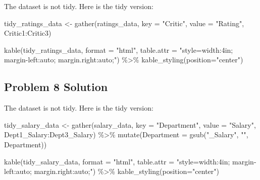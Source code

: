 \documentclass[
  letterpaper,
  DIV=11,
  numbers=noendperiod]{scrreprt}
\newenvironment{Shaded}{\begin{snugshade}}{\end{snugshade}}
\newcommand{\AttributeTok}[1]{\textcolor[rgb]{0.40,0.45,0.13}{#1}}
\newcommand{\FunctionTok}[1]{\textcolor[rgb]{0.28,0.35,0.67}{#1}}
\newcommand{\NormalTok}[1]{\textcolor[rgb]{0.00,0.23,0.31}{#1}}
\newcommand{\OtherTok}[1]{\textcolor[rgb]{0.00,0.23,0.31}{#1}}
\newcommand{\SpecialCharTok}[1]{\textcolor[rgb]{0.37,0.37,0.37}{#1}}
\newcommand{\StringTok}[1]{\textcolor[rgb]{0.13,0.47,0.30}{#1}}
\begin{document}
The dataset is not tidy. Here is the tidy version:

\begin{Shaded}
\begin{Highlighting}[]
\NormalTok{tidy\_ratings\_data }\OtherTok{\textless{}{-}} \FunctionTok{gather}\NormalTok{(ratings\_data, }\AttributeTok{key =} \StringTok{"Critic"}\NormalTok{, }\AttributeTok{value =} \StringTok{"Rating"}\NormalTok{, Critic1}\SpecialCharTok{:}\NormalTok{Critic3)}

\FunctionTok{kable}\NormalTok{(tidy\_ratings\_data, }\AttributeTok{format =} \StringTok{"html"}\NormalTok{, }\AttributeTok{table.attr =} \StringTok{"style=\textquotesingle{}width:4in; margin{-}left:auto; margin.right:auto;\textquotesingle{}"}\NormalTok{)  }\SpecialCharTok{\%\textgreater{}\%}
  \FunctionTok{kable\_styling}\NormalTok{(}\AttributeTok{position=}\StringTok{"center"}\NormalTok{)}
\end{Highlighting}
\end{Shaded}

\subsection*{Problem 8 Solution}\label{problem-8-solution}

The dataset is not tidy. Here is the tidy version:

\begin{Shaded}
\begin{Highlighting}[]
\NormalTok{tidy\_salary\_data }\OtherTok{\textless{}{-}} \FunctionTok{gather}\NormalTok{(salary\_data, }\AttributeTok{key =} \StringTok{"Department"}\NormalTok{, }\AttributeTok{value =} \StringTok{"Salary"}\NormalTok{, Dept1\_Salary}\SpecialCharTok{:}\NormalTok{Dept3\_Salary) }\SpecialCharTok{\%\textgreater{}\%}
  \FunctionTok{mutate}\NormalTok{(}\AttributeTok{Department =} \FunctionTok{gsub}\NormalTok{(}\StringTok{"\_Salary"}\NormalTok{, }\StringTok{""}\NormalTok{, Department))}

\FunctionTok{kable}\NormalTok{(tidy\_salary\_data, }\AttributeTok{format =} \StringTok{"html"}\NormalTok{, }\AttributeTok{table.attr =} \StringTok{"style=\textquotesingle{}width:4in; margin{-}left:auto; margin.right:auto;\textquotesingle{}"}\NormalTok{)  }\SpecialCharTok{\%\textgreater{}\%}
  \FunctionTok{kable\_styling}\NormalTok{(}\AttributeTok{position=}\StringTok{"center"}\NormalTok{)}
\end{Highlighting}
\end{Shaded}
\end{document}
